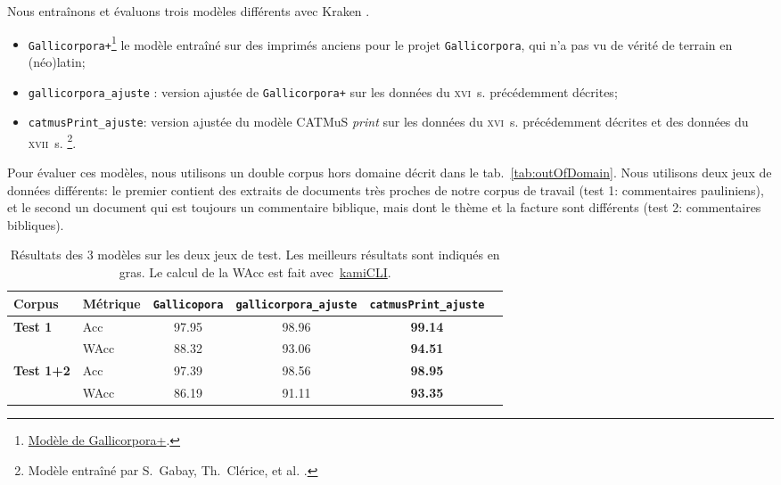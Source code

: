 \documentclass[final, fra]{anthology-ch}      %
\begin{document}
Nous entraînons et évaluons trois modèles différents avec Kraken \cite{kraken}.
\vspace{0.3cm}
\begin{itemize}
    \item \texttt{Gallicorpora+}\footnote{\href{https://doi.org/10.5281/zenodo.7410529}{Modèle de Gallicorpora+}.} le modèle entraîné sur des imprimés anciens pour le projet \texttt{Gallicorpora}, qui n'a pas vu de vérité de terrain en (néo)latin;
    \item \texttt{gallicorpora\_ajuste}\cite{goy_2024_19218113} : version ajustée de \texttt{Gallicorpora+} sur les données du \textsc{xvi}\ieme{}~s. précédemment décrites;
    \item \texttt{catmusPrint\_ajuste}: version ajustée du modèle CATMuS \textit{print} \cite{gabay:hal-04557457} sur les données du \textsc{xvi}\ieme{}~s. précédemment décrites et des données du \textsc{xvii}\ieme{}~s. \cite{gabay_2024_11526040}\footnote{Modèle entraîné par S.~Gabay, Th.~Clérice, et al. \cite{gabay_clerice_2024}.}.
\end{itemize}
\vspace{0.3cm}
Pour évaluer ces modèles, nous utilisons un double corpus hors domaine décrit dans le tab.~\ref{tab:outOfDomain}. Nous utilisons deux jeux de données différents: le premier contient des extraits de documents très proches de notre corpus de travail (test 1: commentaires pauliniens), et le second un document qui est toujours un commentaire biblique, mais dont le thème et la facture sont différents (test 2: commentaires bibliques).

\begin{table}[H]
    \centering
        \begin{tabular}{l|l|c c c c|}
        \toprule
        \textbf{Corpus} & \textbf{Métrique}  & \texttt{Gallicopora}  & \texttt{gallicorpora\_ajuste} & \texttt{catmusPrint\_ajuste} \\
        \midrule
        \multirow{2}{*}{\textbf{Test 1}} 
        & Acc & 97.95 & 98.96 & \textbf{99.14}\\
        & WAcc & 88.32 & 93.06 & \textbf{94.51}\\
        \hline
        \multirow{2}{*}{\textbf{Test 1+2}} 
        & Acc & 97.39 & 98.56 & \textbf{98.95}\\
        & WAcc & 86.19 & 91.11 & \textbf{93.35}\\
        \bottomrule
        \end{tabular}
        \caption{Résultats des 3 modèles sur les deux jeux de test. Les meilleurs résultats sont indiqués en gras. Le calcul de la WAcc est fait avec~\href{https://github.com/FoNDUE-HTR/kamiCLI}{kamiCLI}.}
        \label{tab:wide_table}
    \end{table}
\end{document}
